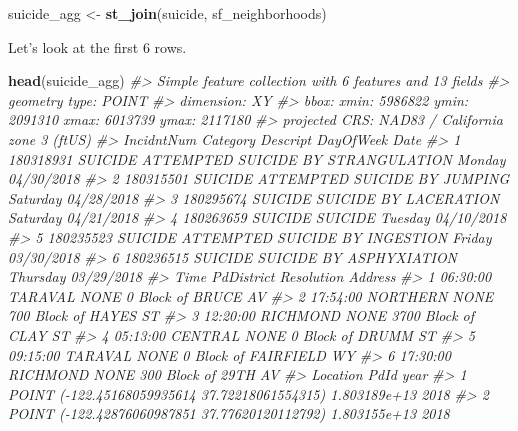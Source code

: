 \documentclass[
  12pt,
]{book}
\newenvironment{Shaded}{\begin{snugshade}}{\end{snugshade}}
\newcommand{\CommentTok}[1]{\textcolor[rgb]{0.37,0.37,0.37}{\textit{#1}}}
\newcommand{\KeywordTok}[1]{\textcolor[rgb]{0.27,0.27,0.27}{\textbf{#1}}}
\newcommand{\NormalTok}[1]{#1}
\newcommand{\StringTok}[1]{\textcolor[rgb]{0.5,0.5,0.5}{#1}}
\begin{document}
\begin{Shaded}
\begin{Highlighting}[]
\NormalTok{suicide\_agg \textless{}{-}}\StringTok{ }\KeywordTok{st\_join}\NormalTok{(suicide, sf\_neighborhoods)}
\end{Highlighting}
\end{Shaded}

Let's look at the first 6 rows.

\begin{Shaded}
\begin{Highlighting}[]
\KeywordTok{head}\NormalTok{(suicide\_agg)}
\CommentTok{\#\textgreater{} Simple feature collection with 6 features and 13 fields}
\CommentTok{\#\textgreater{} geometry type:  POINT}
\CommentTok{\#\textgreater{} dimension:      XY}
\CommentTok{\#\textgreater{} bbox:           xmin: 5986822 ymin: 2091310 xmax: 6013739 ymax: 2117180}
\CommentTok{\#\textgreater{} projected CRS:  NAD83 / California zone 3 (ftUS)}
\CommentTok{\#\textgreater{}   IncidntNum Category                           Descript DayOfWeek       Date}
\CommentTok{\#\textgreater{} 1  180318931  SUICIDE ATTEMPTED SUICIDE BY STRANGULATION    Monday 04/30/2018}
\CommentTok{\#\textgreater{} 2  180315501  SUICIDE       ATTEMPTED SUICIDE BY JUMPING  Saturday 04/28/2018}
\CommentTok{\#\textgreater{} 3  180295674  SUICIDE              SUICIDE BY LACERATION  Saturday 04/21/2018}
\CommentTok{\#\textgreater{} 4  180263659  SUICIDE                            SUICIDE   Tuesday 04/10/2018}
\CommentTok{\#\textgreater{} 5  180235523  SUICIDE     ATTEMPTED SUICIDE BY INGESTION    Friday 03/30/2018}
\CommentTok{\#\textgreater{} 6  180236515  SUICIDE            SUICIDE BY ASPHYXIATION  Thursday 03/29/2018}
\CommentTok{\#\textgreater{}       Time PdDistrict Resolution                 Address}
\CommentTok{\#\textgreater{} 1 06:30:00    TARAVAL       NONE     0 Block of BRUCE AV}
\CommentTok{\#\textgreater{} 2 17:54:00   NORTHERN       NONE   700 Block of HAYES ST}
\CommentTok{\#\textgreater{} 3 12:20:00   RICHMOND       NONE   3700 Block of CLAY ST}
\CommentTok{\#\textgreater{} 4 05:13:00    CENTRAL       NONE     0 Block of DRUMM ST}
\CommentTok{\#\textgreater{} 5 09:15:00    TARAVAL       NONE 0 Block of FAIRFIELD WY}
\CommentTok{\#\textgreater{} 6 17:30:00   RICHMOND       NONE    300 Block of 29TH AV}
\CommentTok{\#\textgreater{}                                         Location         PdId year}
\CommentTok{\#\textgreater{} 1  POINT ({-}122.45168059935614 37.72218061554315) 1.803189e+13 2018}
\CommentTok{\#\textgreater{} 2  POINT ({-}122.42876060987851 37.77620120112792) 1.803155e+13 2018}

\end{Highlighting}
\end{Shaded}
\end{document}
